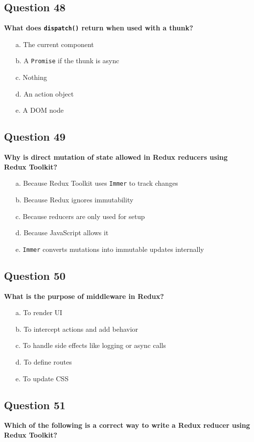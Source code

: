 \documentclass{article}
\begin{document}
\subsection*{Question 48}
\textbf{What does \texttt{dispatch()} return when used with a thunk?}

\begin{itemize}
  \item[a.] The current component
  \item[b.] A \texttt{Promise} if the thunk is async
  \item[c.] Nothing
  \item[d.] An action object
  \item[e.] A DOM node
\end{itemize}

\subsection*{Question 49}
\textbf{Why is direct mutation of state allowed in Redux reducers using Redux Toolkit?}

\begin{itemize}
  \item[a.] Because Redux Toolkit uses \texttt{Immer} to track changes
  \item[b.] Because Redux ignores immutability
  \item[c.] Because reducers are only used for setup
  \item[d.] Because JavaScript allows it
  \item[e.] \texttt{Immer} converts mutations into immutable updates internally
\end{itemize}

\subsection*{Question 50}
\textbf{What is the purpose of middleware in Redux?}

\begin{itemize}
  \item[a.] To render UI
  \item[b.] To intercept actions and add behavior
  \item[c.] To handle side effects like logging or async calls
  \item[d.] To define routes
  \item[e.] To update CSS
\end{itemize}

\subsection*{Question 51}
\textbf{Which of the following is a correct way to write a Redux reducer using Redux Toolkit?}
\end{document}
